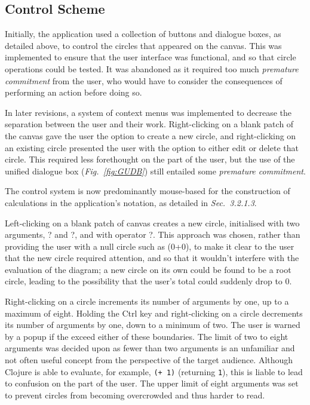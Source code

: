 \documentclass[12pt,twoside,notitlepage,xetex]{report}
\begin{document}
\subsection{Control Scheme}


Initially, the application used a collection of buttons and dialogue boxes, as detailed above, to control the circles that appeared on the canvas.  This was implemented to ensure that the user interface was functional, and so that circle operations could be tested.  It was abandoned as it required too much \emph{premature commitment} from the user, who would have to consider the consequences of performing an action before doing so.

In later revisions, a system of context menus was implemented to decrease the separation between the user and their work.  Right-clicking on a blank patch of the canvas gave the user the option to create a new circle, and right-clicking on an existing circle presented the user with the option to either edit or delete that circle.  This required less forethought on the part of the user, but the use of the unified dialogue box (\emph{Fig.~\ref{fig:GUDB}}) still entailed some \emph{premature commitment}.

The control system is now predominantly mouse-based for the construction of calculations in the application's notation, as detailed in \emph{Sec.~3.2.1.3}.

Left-clicking on a blank patch of canvas creates a new circle, initialised with two arguments, {\sfapp ?} and {\sfapp ?}, and with operator {\sfapp ?}.  This approach was chosen, rather than providing the user with a null circle such as (0+0), to make it clear to the user that the new circle required attention, and so that it wouldn't interfere with the evaluation of the diagram; a new circle on its own could be found to be a root circle, leading to the possibility that the user's total could suddenly drop to 0.

Right-clicking on a circle increments its number of arguments by one, up to a maximum of eight.  Holding the Ctrl key and right-clicking on a circle decrements its number of arguments by one, down to a minimum of two.  The user is warned by a popup if the exceed either of these boundaries.  The limit of two to eight arguments was decided upon as fewer than two arguments is an unfamiliar and not often useful concept from the perspective of the target audience.  Although Clojure is able to evaluate, for example, \verb¬(+ 1)¬ (returning \verb¬1¬), this is liable to lead to confusion on the part of the user.  The upper limit of eight arguments was set to prevent circles from becoming overcrowded and thus harder to read.
\end{document}
